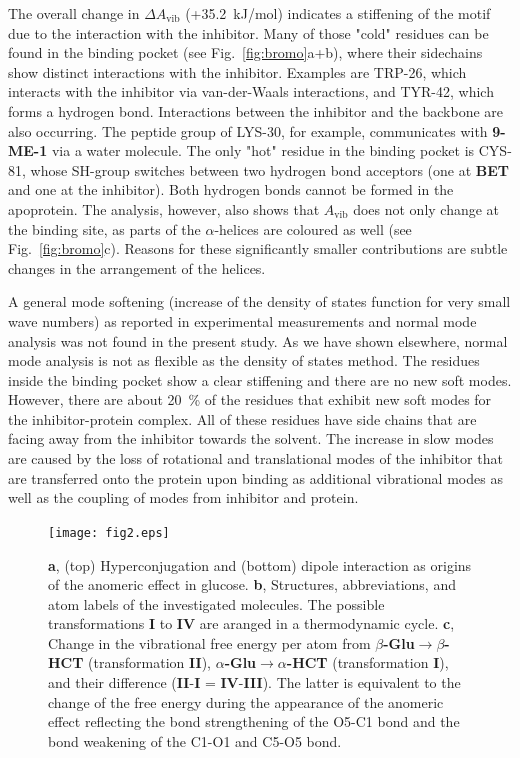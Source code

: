 \documentclass[journal=jpclcd,manuscript=article]{achemso}
\newcommand{\aglu}{\textbf{$\alpha$-Glu}}
\newcommand{\bglu}{\textbf{$\beta$-Glu}}
\newcommand{\ahct}{\textbf{$\alpha$-HCT}}
\newcommand{\bhct}{\textbf{$\beta$-HCT}}
\newcommand{\bet}{\textbf{BET}}
\newcommand{\agluahct}{\textbf{I}}
\newcommand{\bglubhct}{\textbf{II}}
\newcommand{\aglubglu}{\textbf{III}}
\newcommand{\ahctbhct}{\textbf{IV}}
\newcommand{\avib}{A_\mathrm{vib}}
\begin{document}
The overall change in $\Delta \avib{}$ (+35.2~kJ/mol) indicates a stiffening of the motif due to the interaction with the inhibitor. Many of those "cold" residues can be found in the binding pocket (see  Fig.~\ref{fig:bromo}a+b), where their sidechains show distinct interactions with the inhibitor. Examples are TRP-26, which interacts with the inhibitor via van-der-Waals interactions, and TYR-42, which forms a hydrogen bond. Interactions between the inhibitor and the backbone are also occurring. The peptide group of LYS-30, for example, communicates with \textbf{9-ME-1} via a water molecule. The only "hot" residue in the binding pocket is CYS-81, whose SH-group switches between two hydrogen bond acceptors (one at \bet{} and one at the inhibitor). Both hydrogen bonds cannot be formed in the apoprotein. The analysis, however, also shows that $\avib{}$ does not only change at the binding site, as parts of the $\alpha$-helices are coloured as well (see Fig.~\ref{fig:bromo}c). Reasons for these significantly smaller contributions are subtle changes in the arrangement of the helices.

A general mode softening (increase of the density of states function for very small wave numbers) as reported in experimental measurements\cite{2004Balog} and normal mode analysis\cite{2010Moritsugu} was not found in the present study. As we have shown elsewhere\cite{Peters2018}, normal mode analysis is not as flexible as the density of states method. The residues inside the binding pocket show a clear stiffening and there are no new soft modes. However, there are about 20~\% of the residues that exhibit new soft modes for the inhibitor-protein complex. All of these residues have side chains that are facing away from the inhibitor towards the solvent. The increase in slow modes are caused by the loss of rotational and translational modes of the inhibitor that are transferred onto the protein upon binding as additional vibrational modes as well as the coupling of modes from inhibitor and protein.\cite{2010Moritsugu}

\begin{figure}[h!]
	\centering
	\texttt{[image: fig2.eps]}
	\caption{%
		\textbf{a}, (top) Hyperconjugation and (bottom) dipole interaction as origins of the anomeric effect in glucose.
		\textbf{b}, Structures, abbreviations, and atom labels of the investigated molecules. The possible transformations \textbf{I} to \textbf{IV} are aranged in a thermodynamic cycle.
		\textbf{c}, Change in the vibrational free energy per atom from \bglu{}$\rightarrow$\bhct{} (transformation \bglubhct{}), \aglu{}$\rightarrow$\ahct{} (transformation \agluahct{}), and their difference (\bglubhct{}-\agluahct{} = \ahctbhct{}-\aglubglu{}). The latter is equivalent to the change of the free energy during the appearance of the anomeric effect reflecting the bond strengthening of the O5-C1 bond and the bond weakening of the C1-O1 and C5-O5 bond.
	}
	\label{fig:glucose}
\end{figure}
\end{document}
